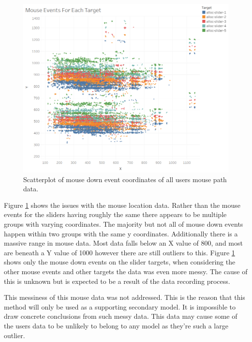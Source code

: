 \documentclass{article}
\begin{document}
\begin{figure}[ht!]
    \centering
    \includegraphics[scale=0.65]{Images/Mouse-Events-For-Each-Target.png}
    \caption{Scatterplot of mouse down event coordinates of all users mouse path data.}
    \label{fig:MouseEventsTargets}
\end{figure}

Figure \ref{fig:MouseEventsTargets} shows the issues with the mouse location data.
Rather than the mouse events for the sliders having roughly the same there appears to be multiple groups with varying coordinates.
The majority but not all of mouse down events happen within two groups with the same y coordinates. 
Additionally there is a massive range in mouse data.
Most data falls below an X value of 800, and most are beneath a Y value of 1000 however there are still outliers to this.
Figure \ref{fig:MouseEventsTargets} shows only the mouse down events on the slider targets, when considering the other mouse events and other targets the data was even more messy. 
The cause of this is unknown but is expected to be a result of the data recording process.

This messiness of this mouse data was not addressed.
This is the reason that this method will only be used as a supporting secondary model.
It is impossible to draw concrete conclusions from such messy data.
This data may cause some of the users data to be unlikely to belong to any model as they’re such a large outlier.
\end{document}
